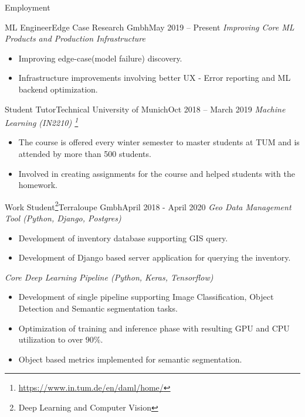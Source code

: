\documentclass[]{mcdowellcv}
\begin{document}
    \begin{cvsection}{Employment}

            \begin{cvsubsection}{ML Engineer}{Edge Case Research Gmbh}{May 2019 -- Present}
        \textit{Improving Core ML Products and Production Infrastructure}
            \begin{itemize}
                \item Improving edge-case(model failure) discovery.
                \item Infrastructure improvements involving better UX - Error reporting and ML backend optimization.
            \end{itemize}
        \end{cvsubsection}
    
            \begin{cvsubsection}{Student Tutor}{Technical University of Munich}{Oct 2018 -- March 2019}    
        \textit{Machine Learning (IN2210) \footnote{\href{https://www.in.tum.de/en/daml/home/}{https://www.in.tum.de/en/daml/home/}}}
            \begin{itemize}
                \item The course is offered every winter semester to master students at TUM and is attended by more than 500 students. 
                \item Involved in creating assignments for the course and helped students with the homework. 
            \end{itemize}
        \end{cvsubsection}
    
        \begin{cvsubsection}{Work Student\footnote{Deep Learning and Computer Vision\label{ws}}}{Terraloupe Gmbh}{April 2018 - April 2020}
            \textit{Geo Data Management Tool (Python, Django, Postgres)}
            \begin{itemize}
                \item Development of inventory database supporting GIS query.
                \item Development of Django based server application for querying the inventory.
            \end{itemize}
                
            \textit{Core Deep Learning Pipeline (Python, Keras, Tensorflow)}
            \begin{itemize}
                \item Development of single pipeline supporting Image Classification, Object Detection and Semantic segmentation tasks.
                \item Optimization of training and inference phase with resulting GPU and CPU utilization to over $90\%$.
                \item Object based metrics implemented for semantic segmentation.
            \end{itemize}
            

\end{cvsubsection}
\end{cvsection}
\end{document}
